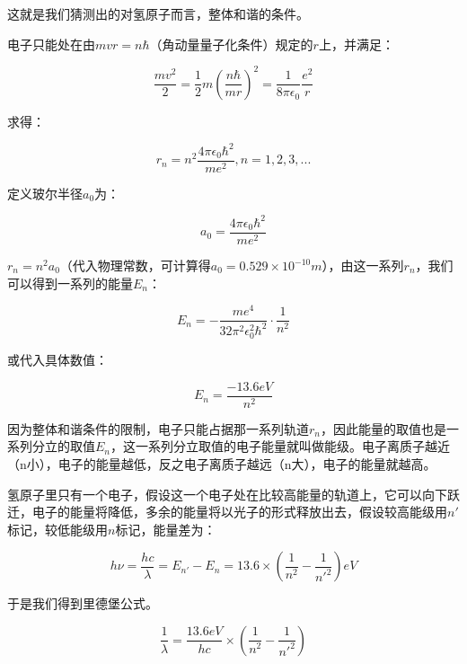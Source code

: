 这就是我们猜测出的对氢原子而言，整体和谐的条件。

电子只能处在由$mvr=n \hbar$（角动量量子化条件）规定的$r$上，并满足：

\begin{equation*}
\frac{m v^2}{2} = \frac{1}{2} m \left(  \frac{ n \hbar  }{ m r }  \right)^2 = \frac{1}{8 \pi \epsilon_0 } \frac{e^2 }{r }  
\end{equation*}

求得：

\begin{equation}
r_n = n^2 \frac{4 \pi \epsilon_0 \hbar^2  }{ m e^2}, n = 1, 2, 3, ...
\end{equation}

定义玻尔半径$a_0$为：

\begin{equation}
a_0 = \frac{4 \pi \epsilon_0 \hbar^2  }{ m e^2}
\end{equation}

$r_n = n^2 a_0$（代入物理常数，可计算得$a_0 = 0.529 \times 10^{-10} m$），由这一系列$r_n$，我们可以得到一系列的能量$E_n$：

\begin{equation}
E_n = - \frac{m e^4 }{ 32 \pi^2 \epsilon_0^2 \hbar^2 } \cdot {\frac{1}{n^2}}
\end{equation}

或代入具体数值：

\begin{equation}
E_n = \frac{-13.6 eV}{n^2}
\end{equation}

因为整体和谐条件的限制，电子只能占据那一系列轨道$r_n$，因此能量的取值也是一系列分立的取值$E_n$，这一系列分立取值的电子能量就叫做能级。电子离质子越近（n小），电子的能量越低，反之电子离质子越远（n大），电子的能量就越高。

氢原子里只有一个电子，假设这一个电子处在比较高能量的轨道上，它可以向下跃迁，电子的能量将降低，多余的能量将以光子的形式释放出去，假设较高能级用$n'$标记，较低能级用$n$标记，能量差为：

\begin{equation}
h \nu = \frac{hc}{\lambda} = E_{n'} - E_n = 13.6 \times \left( \frac{1}{n^2}  - \frac{1}{n'^2} \right) eV 
\end{equation}

于是我们得到里德堡公式。

\begin{equation}
\frac{1}{\lambda } = \frac{13.6 eV}{hc} \times \left( \frac{1}{n^2}  - \frac{1}{n'^2} \right)
\end{equation}

